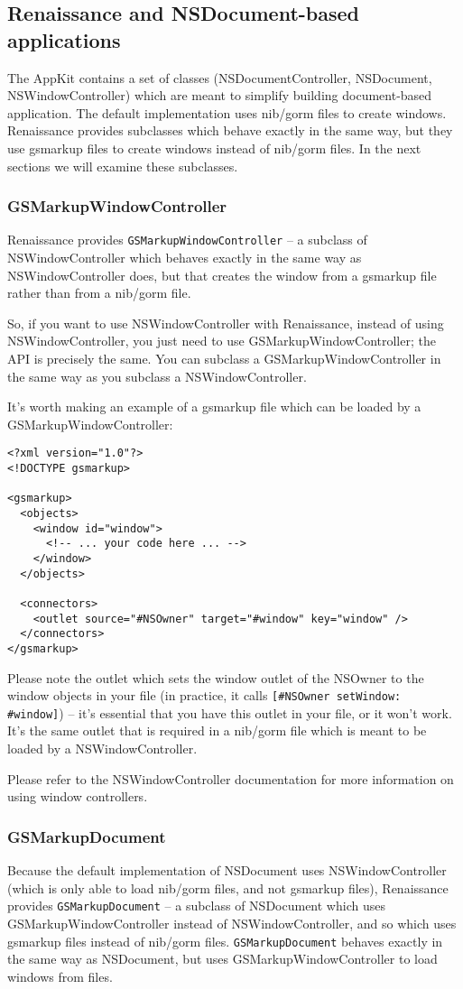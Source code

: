 \subsection{Renaissance and NSDocument-based applications}
The AppKit contains a set of classes (NSDocumentController,
NSDocument, NSWindowController) which are meant to simplify building
document-based application.  The default implementation uses nib/gorm
files to create windows.  Renaissance provides subclasses which behave
exactly in the same way, but they use gsmarkup files to create windows
instead of nib/gorm files.  In the next sections we will examine these
subclasses.

\subsubsection{GSMarkupWindowController}
Renaissance provides \texttt{GSMarkupWindowController} -- a subclass
of NSWindowController which behaves exactly in the same way as
NSWindowController does, but that creates the window from a gsmarkup
file rather than from a nib/gorm file.

So, if you want to use NSWindowController with Renaissance, instead of
using NSWindowController, you just need to use
GSMarkupWindowController; the API is precisely the same.  You can
subclass a GSMarkupWindowController in the same way as you subclass a
NSWindowController.

It's worth making an example of a gsmarkup file which can be loaded by 
a GSMarkupWindowController:
\begin{verbatim}
<?xml version="1.0"?>
<!DOCTYPE gsmarkup>

<gsmarkup>
  <objects>
    <window id="window">
      <!-- ... your code here ... -->
    </window>
  </objects>

  <connectors>
    <outlet source="#NSOwner" target="#window" key="window" />
  </connectors>
</gsmarkup>
\end{verbatim}
Please note the outlet which sets the window outlet of the NSOwner to
the window objects in your file (in practice, it calls
\texttt{[\#NSOwner setWindow: \#window]}) -- it's essential that you have
this outlet in your file, or it won't work.  It's the same outlet that
is required in a nib/gorm file which is meant to be loaded by a 
NSWindowController.

Please refer to the NSWindowController documentation for more information
on using window controllers.

\subsubsection{GSMarkupDocument}
Because the default implementation of NSDocument uses
NSWindowController (which is only able to load nib/gorm files, and not
gsmarkup files), Renaissance provides \texttt{GSMarkupDocument} -- a
subclass of NSDocument which uses GSMarkupWindowController instead of
NSWindowController, and so which uses gsmarkup files instead of
nib/gorm files.  \texttt{GSMarkupDocument} behaves exactly in the same
way as NSDocument, but uses GSMarkupWindowController to load windows
from files.

